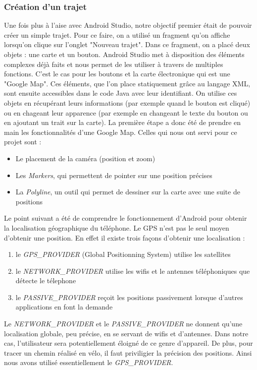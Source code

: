 \subsubsection{Création d'un trajet}
Une fois plus à l'aise avec Android Studio, notre objectif premier était de pouvoir créer un simple trajet. Pour ce faire, on a utilisé un
fragment qu'on affiche lorsqu'on clique sur l'onglet "Nouveau trajet". Dans ce fragment, on a placé deux objets : une carte et un bouton.
Android Studio met à disposition des éléments complexes déjà faits et nous permet de les utiliser à travers de multiples fonctions. C'est le
cas pour les boutons et la carte électronique qui est une "Google Map". Ces éléments, que l'on place statiquement grâce au langage XML, sont
ensuite accessibles dans le code Java avec leur identifiant. On utilise ces objets en récupérant leurs informations
(par exemple quand le bouton est cliqué) ou en chageant leur apparence (par exemple en changeant le texte du bouton ou en ajoutant un trait
sur la carte).
La première étape a donc été de prendre en main les fonctionnalités d'une Google Map. Celles qui nous ont servi pour ce projet sont :
\begin{itemize}
  \item Le placement de la caméra (position et zoom)
  \item Les \emph{Markers}, qui permettent de pointer sur une position précises
  \item La \emph{Polyline}, un outil qui permet de dessiner sur la carte avec une suite de positions
\end{itemize}
Le point suivant a été de comprendre le fonctionnement d'Android pour obtenir la localisation géographique du téléphone. Le GPS n'est pas le
seul moyen d'obtenir une position. En effet il existe trois façons d'obtenir une localisation :
\begin{enumerate}
  \item le \emph{GPS\_PROVIDER} (Global Positionning System) utilise les satellites
  \item le \emph{NETWORK\_PROVIDER} utilise les wifis et le antennes téléphoniques que détecte le télephone
  \item le \emph{PASSIVE\_PROVIDER} reçoit les positions passivement lorsque d'autres applications en font la demande
\end{enumerate}
Le \emph{NETWORK\_PROVIDER} et le \emph{PASSIVE\_PROVIDER} ne donnent qu'une localisation globale, peu précise, en se servant de wifis
et d'antennes. Dans notre cas, l'utilisateur sera potentiellement éloigné de ce genre d'appareil. De plus, pour tracer un chemin réalisé
en vélo, il faut priviligier la précision des positions. Ainsi nous avons utilisé essentiellement le \emph{GPS\_PROVIDER}.

